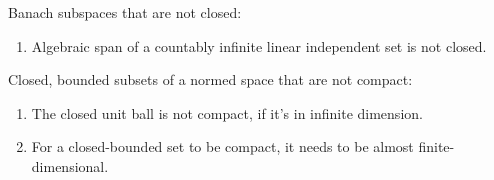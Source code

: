 
Banach subspaces that are not closed:
\begin{enumerate}
	\item Algebraic span of a countably infinite linear independent set is not closed.
\end{enumerate}

Closed, bounded subsets of a normed space that are not compact:
\begin{enumerate}
	\item The closed unit ball is not compact, if it's in infinite dimension.
	\item For a closed-bounded set to be compact, it needs to be almost finite-dimensional.
\end{enumerate}
